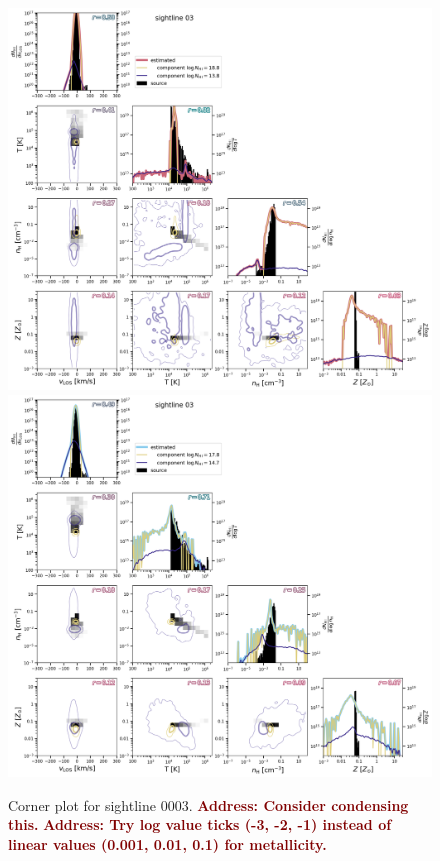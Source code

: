 \documentclass[fleqn,usenatbib]{mnras}
\newcommand{\todo}[1]{\textcolor{Maroon}{\textbf{Address: #1}}}
\begin{document}
\begin{figure}
    \centering
    \includegraphics[height=0.45\textheight]{figures/sample2/original/sightline_0003.png}
    \includegraphics[height=0.45\textheight]{figures/sample2/high-z/sightline_0003.png}
    \caption{Corner plot for sightline 0003.
    \todo{Consider condensing this.}
    \todo{Try log value ticks (-3, -2, -1) instead of linear values (0.001, 0.01, 0.1) for metallicity.}}
    \label{f: sample2 03}
\end{figure}
\end{document}
